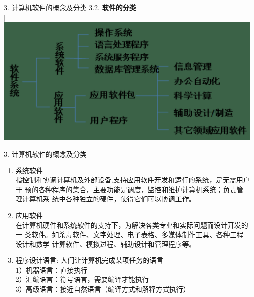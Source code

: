 \documentclass[aspectratio=169]{beamer}
\begin{document}
\begin{frame}[t]{3. 计算机软件的概念及分类} \vspace{20pt}
    3.2. \textbf{软件的分类}\\
    |\\
    \includegraphics[scale=0.3]{computer_software}\\ 
\end{frame}


\begin{frame}[t]{3. 计算机软件的概念及分类} \vspace{20pt}
    \begin{enumerate}
        \item{系统软件}\\
            指控制和协调计算机及外部设备,支持应用软件开发和运行的系统，是无需用户干
预的各种程序的集合，主要功能是调度，监控和维护计算机系统；负责管理计算机系
统中各种独立的硬件，使得它们可以协调工作。\\

        \item{应用软件}\\
            在计算机硬件和系统软件的支持下，为解决各类专业和实际问题而设计开发的一
类软件。如杀毒软件、文字处理、电子表格、多媒体制作工具、各种工程设计和数学
计算软件、模拟过程、辅助设计和管理程序等。\\
        \item{程序设计语言}: 人们让计算机完成某项任务的语言\\
            1）机器语言：直接执行\\
2）汇编语言：符号语言，需要编译才能执行\\
3）高级语言：接近自然语言（编译方式和解释方式执行）\\
    \end{enumerate}

\end{frame}
\end{document}
